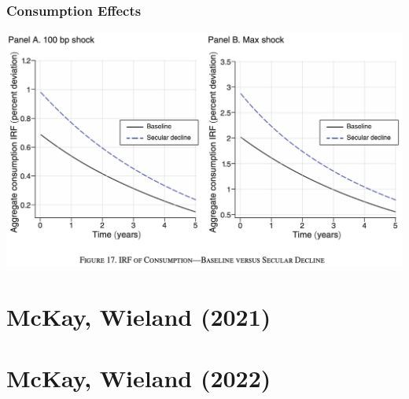 \documentclass[english,xcolor=svgnames]{beamer}
\begin{document}
\begin{frame}
    \frametitle{Consumption Effects}
    \begin{center}
    	\includegraphics[scale=0.3]{figures/BMTVFIG17.png}	
    \end{center}
\end{frame}


\section{McKay, Wieland (2021)}


\section{McKay, Wieland (2022)}
\end{document}
